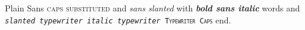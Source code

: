 \documentclass{article}
\begin{document}
Plain \textsf{Sans \textsc{caps substituted}} and \textsf{\textsl{sans slanted}} with \textsf{\textbf{\textit{bold sans italic}}} words and \texttt{\textsl{slanted typewriter} \textit{italic typewriter} \textsc{Typewriter Caps}} end.
\end{document}
